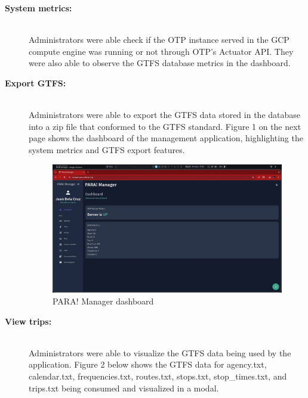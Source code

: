 \documentclass{icsthesis}
\begin{document}
\begin{mainmatter}
		\begin{description}
			\item[\textbf{System metrics:}] \hfill \\
				Administrators were able check if the OTP instance served in the GCP compute engine was running or not through OTP's Actuator API. They were also able to observe the GTFS database metrics in the dashboard.
			
			\item[\textbf{Export GTFS:}] \hfill \\
				Administrators were able to export the GTFS data stored in the database into a zip file that conformed to the GTFS standard. Figure 1 on the next page shows the dashboard of the management application, highlighting the system metrics and GTFS export features.
		
		\begin{figure}[h]
			\centering
				\includegraphics[scale=0.18]{./figures/manager/dashboard.jpeg}
			\caption{PARA! Manager dashboard}
		\end{figure}
	    
        \newpage

		\item[\textbf{View trips:}] \hfill \\
				Administrators were able to visualize the GTFS data being used by the application. Figure 2 below shows the GTFS data for agency.txt, calendar.txt, frequencies.txt, routes.txt, stops.txt, stop\_times.txt, and trips.txt being consumed and visualized in a modal. 
		

\end{description}
\end{mainmatter}
\end{document}

